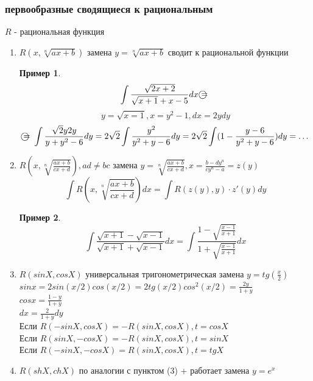 \documentclass[a4paper]{article}
\theoremstyle{definition}
\newtheorem*{exmp}{Пример}
\newtheorem*{comment}{Замечание}
\numberwithin{theorem}{subsection}
\numberwithin{lemma}{subsection}
\numberwithin{definition}{subsection}
\numberwithin{comment*}{subsection}
\numberwithin{consequence}{subsection}
\numberwithin{property}{subsection}
\begin{document}
\subsubsection{первообразные сводящиеся к рациональным}
$R$ - рациональная функция
\begin{enumerate}
 \item $R(x,\sqrt[n]{ax+b})$ замена $y = \sqrt[n]{ax+b}$ сводит к рациональной функции

       \begin{exmp}
        $$ \int \frac{\sqrt{2x+2}}{\sqrt{x+1} + x - 5} dx \text{\textcircled{ = }}$$
        $$ y = \sqrt{x=1}, x = y^2 - 1, dx = 2ydy $$
        $$ \text{\textcircled{ = }} \int \frac{\sqrt{2} y 2y}{y + y^2 - 6} dy = 2\sqrt{2} \int \frac{y^2}{y^2+y-6} dy  = 2\sqrt{2} \int (1- \frac{y-6}{y^2+y-6}) dy = \dots$$
       \end{exmp}
 \item $R(x, \sqrt[n]{\frac{ax+b}{cx+d}}), ad \ne bc$ замена $y=\sqrt[n]{\frac{ax+b}{cx+d}}, x = \frac{b - dy^n}{cy^n-a} = z(y)$
       $$ \int R(x, \sqrt[n]{\frac{ax+b}{cx+d}}) dx = \int R(z(y), y)\cdot z'(y) dy$$
       \begin{exmp}
        $$ \int \frac{\sqrt{x+1} - \sqrt{x-1}}{\sqrt{x+1} + \sqrt{x-1}} dx = \int \frac{1 - \sqrt{\frac{x-1}{x+1}}}{1 + \sqrt{\frac{x-1}{x+1}}} dx$$
       \end{exmp}
 \item $R(sinX, cosX)$ универсальная тригонометрическая замена $y = tg(\frac{x}{2})$
       $sinx = 2 sin(x/2)cos(x/2) = 2 tg(x/2) cos^2(x/2) = \frac{2 y}{1+y}$\\
       $cosx= \frac{1-y}{1+y}$ \\
       $dx = \frac{2}{1+y} dy$ \\
       Если $R(-sinX, cosX) = - R(sinX, cosX), t = cosX$\\
       Если $R(sinX, -cosX) = - R(sinX, cosX), t = sinX$\\
       Если $R(-sinX, -cosX) =  R(sinX, cosX), t = tgX$\\
 \item $R(shX, chX)$ по аналогии с пунктом (3) + работает замена $y = e^x$
\end{enumerate}
\end{document}
